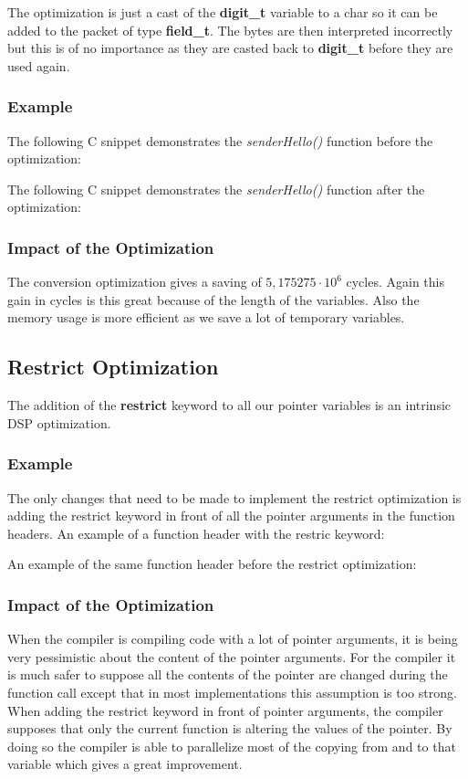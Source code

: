 \documentclass[a4paper]{article}
\begin{document}
The optimization is just a cast of the \textbf{digit\_t} variable to a char so it can be added to the packet of type \textbf{field\_t}. The bytes are then interpreted incorrectly but this is of no importance as they are casted back to \textbf{digit\_t} before they are used again.

\subsubsection{Example}
The following C snippet demonstrates the \textit{senderHello()} function before the optimization:

The following C snippet demonstrates the \textit{senderHello()} function after the optimization:


\subsubsection{Impact of the Optimization}
The conversion optimization gives a saving of $5,175275\cdot10^{6}$ cycles. Again this gain in cycles is this great because of the length of the variables. Also the memory usage is more efficient as we save a lot of temporary variables.

\subsection{Restrict Optimization}

The addition of the \textbf{restrict} keyword to all our pointer variables is an intrinsic DSP optimization.

\subsubsection{Example}
The only changes that need to be made to implement the restrict optimization is adding the restrict keyword in front of all the pointer arguments in the function headers. An example of a function header with the restric keyword:


An example of the same function header before the restrict optimization:



\subsubsection{Impact of the Optimization}
When the compiler is compiling code with a lot of pointer arguments, it is being very pessimistic about the content of the pointer arguments. For the compiler it is much safer to suppose all the contents of the pointer are changed during the function call except that in most implementations this assumption is too strong. When adding the restrict keyword in front of pointer arguments, the compiler supposes that only the current function is altering the values of the pointer. By doing so the compiler is able to parallelize most of the copying from and to that variable which gives a great improvement.\\
\end{document}
